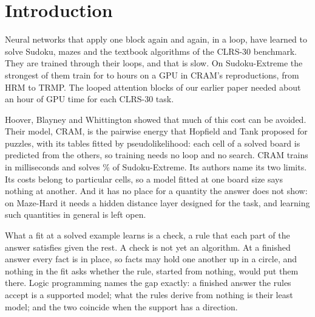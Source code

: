 \section{Introduction}

Neural networks that apply one block again and again, in a loop, have learned to solve Sudoku, mazes and the textbook
algorithms of the CLRS-30 benchmark\cite{wang2025hrm,jolicoeur2025trm,velickovic2022clrs,bansal2022end}. They are
trained through their loops, and that is slow. On Sudoku-Extreme the strongest of them train for  to
 hours on a GPU in CRAM's reproductions\cite{hoover2026classical}, from HRM to
TRMP\cite{wang2025hrm,jolicoeur2025trm,salvatori2026tiny,chen2026energy}. The looped attention blocks of our earlier paper needed
about an hour of GPU time for each CLRS-30 task\cite{mohsenvand2026zero}.

Hoover, Blayney and Whittington showed that much of this cost can be avoided\cite{hoover2026classical}. Their model,
CRAM, is the pairwise energy that Hopfield and Tank proposed for puzzles\cite{hopfield1985neural}, with its tables fitted
by pseudolikelihood\cite{besag1975statistical}: each cell of a solved board is predicted from the others, so training
needs no loop and no search. CRAM trains in  milliseconds and solves \% of
Sudoku-Extreme. Its authors name its two limits. Its costs belong to particular cells, so a model fitted at one board
size says nothing at another. And it has no place for a quantity the answer does not show: on Maze-Hard it needs a
hidden distance layer designed for the task, and learning such quantities in general is left open.

What a fit at a solved example learns is a check, a rule that each part of the answer satisfies given the rest. A check
is not yet an algorithm. At a finished answer every fact is in place, so facts may hold one another up in a circle, and
nothing in the fit asks whether the rule, started from nothing, would put them there. Logic programming names the gap
exactly: a finished answer the rules accept is a supported model; what the rules derive from nothing is their least
model; and the two coincide when the support has a direction\cite{clark1978negation,fages1994consistency}.

